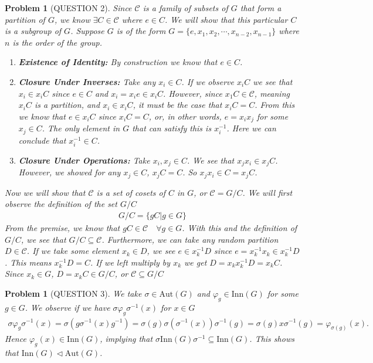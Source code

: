 \documentclass[titlepage]{article}
\theoremstyle{plain}
\newtheorem{problem}[theorem]{Problem}
\theoremstyle{definition}
\theoremstyle{remark}
\theoremstyle{exercise-style}
\numberwithin{equation}{section}
\numberwithin{theorem}{section}
\numberwithin{remark}{section}
\begin{document}
\begin{problem}[QUESTION 2]
    Since $\mathcal{C}$ is a family of subsets of $G$ that form a partition of $G$, we know $\exists C \in \mathcal{C}$ where $e\in C$. We will show that this particular $C$ is a subgroup of $G$. Suppose $G$ is of the form $G = \{ e,x_1,x_2, \cdots, x_{n-2}, x_{n-1} \}$ where $n$ is the order of the group.
    \begin{enumerate}
        \item \textbf{Existence of Identity:} By construction we know that $e \in C$.
        \item \textbf{Closure Under Inverses:} Take any $x_i \in C$. If we observe $x_iC$ we see that $x_i \in x_iC$ since $e \in C$ and $x_i=x_i e \in x_iC$. However, since $x_1C \in \mathcal{C}$, meaning $x_iC$ is a partition, and $x_i \in x_iC$, it must be the case that $x_iC = C$. From this we know that $e \in x_iC$ since $x_iC = C$, or, in other words, $e = x_i x_j$ for some $x_j \in C$. The only element in $G$ that can satisfy this is $x_i^{-1}$. Here we can conclude that $x_i^{-1} \in C$.
        \item \textbf{Closure Under Operations:} Take $x_i, x_j \in C$. We see that $x_j x_i \in x_jC$. However, we showed for any $x_j \in C$, $x_j C = C$. So $x_jx_i \in C = x_jC$.
    \end{enumerate}
    Now we will show that $\mathcal{C}$ is a set of cosets of $C$ in $G$, or $\mathcal{C} = G/C$. We will first observe the definition of the set $G/C$
    \begin{align}
        G/C = \{ gC | g \in G \}
    \end{align}
    From the premise, we know that $gC \in \mathcal{C} \quad \forall g \in G$. With this and the definition of $G/C$, we see that $G/C \subseteq \mathcal{C}$. Furthermore, we can take any random partition $D \in \mathcal{C}$. If we take some element $x_k \in D$, we see $e\in x_k^{-1}D$ since $e = x_k^{-1}x_k \in x_k^{-1}D$. This means $x_k^{-1}D = C$. If we left multiply by $x_k$ we get $D = x_kx_k^{-1}D= x_kC$. Since $x_k \in G$, $D=x_kC\in G/C$, or $\mathcal{C}\subseteq G/C$
\end{problem}

\begin{problem}[QUESTION 3]
    We take $\sigma \in \mathrm{Aut}(G)$ and $\varphi_g \in \mathrm{Inn}(G)$ for some $g \in G$. We observe if we have $\sigma \varphi_g\sigma^{-1}(x)$ for $x \in G$
    \begin{align}
        \sigma \varphi_g\sigma^{-1}(x) = \sigma (g\sigma^{-1}(x)g^{-1})= \sigma(g)\sigma(\sigma^{-1}(x))\sigma^{-1}(g) = \sigma(g)x\sigma^{-1}(g) = \varphi_{\sigma(g)}(x).
    \end{align}
    Hence $\varphi_g(x) \in \mathrm{Inn}(G)$, implying that $\sigma \mathrm{Inn}(G)\sigma^{-1} \subseteq \mathrm{Inn}(G)$. This shows that $\mathrm{Inn}(G) \triangleleft \mathrm{Aut}(G)$.
\end{problem}
\end{document}
